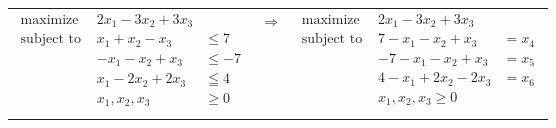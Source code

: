 \begin{enumerate}
        \begin{tabular}{m{7cm}cm{7cm}}
            \begin{eqnarray*}
                \textrm{maximize } & 2x_1 - 3x_2 + 3x_3\\
                \textrm{subject to } & x_1 + x_2 - x_3 & \leq 7\\
                                     & -x_1 - x_2 + x_3 & \leq -7  \\
                                     & x_1 - 2x_2 + 2x_3 & \leqq 4 \\
                                     & x_1, x_2, x_3 & \geq 0\\
            \end{eqnarray*}
            & $\Rightarrow$ &
            \begin{eqnarray*}
                \textrm{maximize } & 2x_1 - 3x_2 + 3x_3\\
                \textrm{subject to } &  7 - x_1 - x_2 + x_3  & = x_4 \\
                                     &  -7 - x_1 - x_2 + x_3 & = x_5  \\
                                     &  4 - x_1 + 2x_2 - 2x_3 & = x_6  \\
                                     & x_1, x_2, x_3  \geq 0\\
            \end{eqnarray*}
        \end{tabular}


\end{enumerate}
